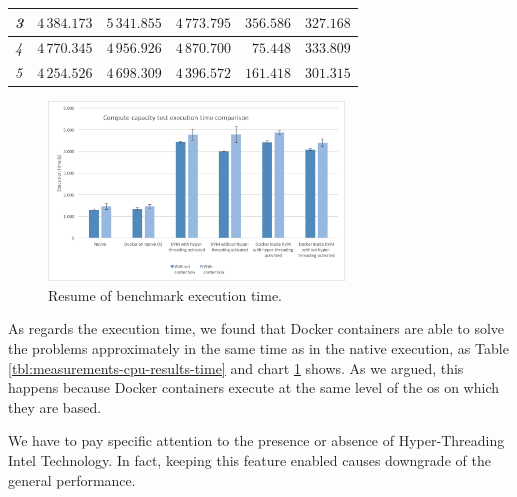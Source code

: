 \begin{center}
\begin{tabular}{| l | r | r | r | r | r |}
		\textit{3}                & $4\,384.173$ & $5\,341.855$ & $4\,773.795$ & $356.586$          & $327.168$             \\ \hline
		\textit{4}                & $4\,770.345$ & $4\,956.926$ & $4\,870.700$ & $75.448$           & $333.809$             \\ \hline
		\textit{5}                & $4\,254.526$ & $4\,698.309$ & $4\,396.572$ & $161.418$          & $301.315$             \\ \hline
	\end{tabular}
	\label{tbl:measurements-cpu-results-time}
\end{center}

\begin{figure}
	\centering{}
	\includegraphics[width=0.7\textwidth]{chapters/measurements/images/cpu-time.png}
	\caption[Compute - resume of benchmark execution time]{Resume of benchmark execution time.}
	\label{img:measurements-cpu-results-time}
\end{figure}

As regards the execution time, we found that Docker containers are able to solve the problems
approximately in the same time as in the native execution, as Table \ref{tbl:measurements-cpu-results-time}
and chart \ref{img:measurements-cpu-results-time} shows. As we argued, this happens because
Docker containers execute at the same level of the \acs{os} on which they are based.

We have to pay specific attention to the presence or absence of Hyper-Threading Intel Technology. In fact,
keeping this feature enabled causes downgrade of the general performance.